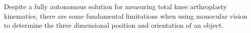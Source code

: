 Despite a fully autonomous solution for measuring total knee arthroplasty kinematics, there are some fundamental limitations when using monocular vision to determine the three dimensional position and orientation of an object.

